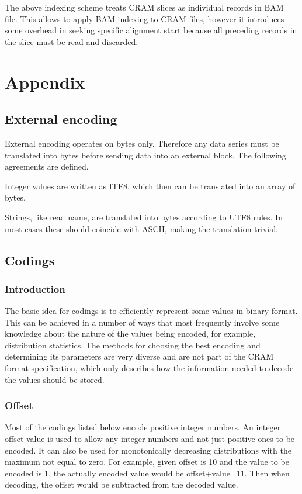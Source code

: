 \documentclass[a4paper]{article}
\begin{document}
The above indexing scheme treats CRAM slices as individual records in BAM file. 
This allows to apply BAM indexing to CRAM files, however it introduces some overhead 
in seeking specific alignment start because all preceding records in the slice 
must be read and discarded.

\section{\textbf{Appendix}}

\subsection{\textbf{External encoding}}

External encoding operates on bytes only. Therefore any data series must be translated 
into bytes before sending data into an external block. The following agreements 
are defined. 

Integer values are written as ITF8, which then can be translated into an array 
of bytes. 

Strings, like read name, are translated into bytes according to UTF8 rules. In 
most cases these should coincide with ASCII, making the translation trivial. 

\subsection{\textbf{Codings}}

\subsubsection*{Introduction}

The basic idea for codings is to efficiently represent some values in binary format. 
This can be achieved in a number of ways that most frequently involve some knowledge 
about the nature of the values being encoded, for example, distribution statistics. 
The methods for choosing the best encoding and determining its parameters are very 
diverse and are not part of the CRAM format specification, which only describes 
how the information needed to decode the values should be stored.

\subsubsection*{Offset}

Most of the codings listed below encode positive integer numbers. An integer offset 
value is used to allow any integer numbers and not just positive ones to be encoded. 
It can also be used for monotonically decreasing distributions with the maximum 
not equal to zero. For example, given offset is 10 and the value to be encoded 
is 1, the actually encoded value would be offset+value=11. Then when decoding, 
the offset would be subtracted from the decoded value. 
\end{document}
